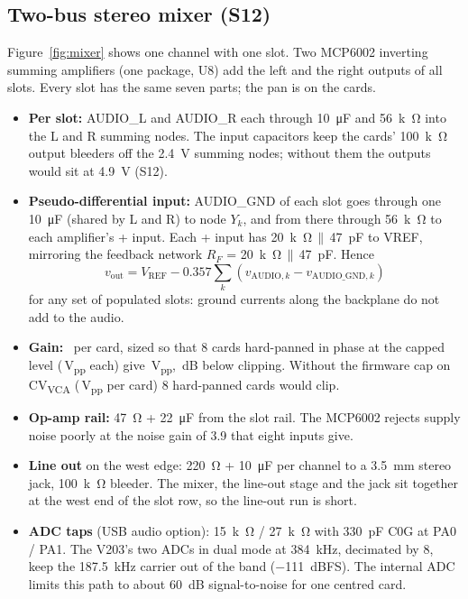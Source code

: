 \documentclass[11pt,a4paper]{article}
\newcommand{\sub}[1]{\textsubscript{#1}}
\begin{document}
\subsection{Two-bus stereo mixer (S12)}\label{sec:mixer}
Figure~\ref{fig:mixer} shows one channel with one slot. Two MCP6002 inverting summing amplifiers (one package, U8) add
the left and the right outputs of all slots. Every slot has the same seven parts; the pan is on the cards.
\begin{itemize}
  \item \textbf{Per slot:} AUDIO\_L and AUDIO\_R each through \SI{10}{\micro F} and \SI{56}{k\ohm} into the L and R
    summing nodes. The input capacitors keep the cards' \SI{100}{k\ohm} output bleeders off the \SI{2.4}{V} summing
    nodes; without them the outputs would sit at \SI{4.9}{V} (S12).
  \item \textbf{Pseudo-differential input:} AUDIO\_GND of each slot goes through one \SI{10}{\micro F} (shared by L and R)
    to node $Y_k$, and from there through \SI{56}{k\ohm} to each amplifier's + input. Each + input has
    \SI{20}{k\ohm}\,$\parallel$\,\SI{47}{pF} to VREF, mirroring the feedback network $R_F$ = \SI{20}{k\ohm}\,$\parallel$\,\SI{47}{pF}. Hence
    \begin{equation}
      v_\mathrm{out} = V_\mathrm{REF} - 0.357 \sum_k \left(v_{\mathrm{AUDIO},k} - v_{\mathrm{AUDIO\_GND},k}\right)
    \end{equation}
    for any set of populated slots: ground currents along the backplane do not add to the audio.
  \item \textbf{Gain:} \statStwelveGain\ per card, sized so that 8 cards hard-panned in phase at the capped level
    (\statStwelveCardHard\,V\sub{pp} each) give \statStwelveHard\,V\sub{pp}, \statStwelveHardMargin\,dB below clipping.
    Without the firmware cap on CV\sub{VCA} (\statStwelveCardUncapped\,V\sub{pp} per card) 8 hard-panned cards would
    clip.
  \item \textbf{Op-amp rail:} \SI{47}{\ohm} + \SI{22}{\micro F} from the slot rail. The MCP6002 rejects supply noise
    poorly at the noise gain of 3.9 that eight inputs give.
  \item \textbf{Line out} on the west edge: \SI{220}{\ohm} + \SI{10}{\micro F} per channel to a \SI{3.5}{mm} stereo jack,
    \SI{100}{k\ohm} bleeder. The mixer, the line-out stage and the jack sit together at the west end of the slot row,
    so the line-out run is short.
  \item \textbf{ADC taps} (USB audio option): \SI{15}{k\ohm} / \SI{27}{k\ohm} with \SI{330}{pF} C0G at PA0 / PA1. The
    V203's two ADCs in dual mode at \SI{384}{kHz}, decimated by 8, keep the \SI{187.5}{kHz} carrier out of the band
    (\SI{-111}{dBFS}). The internal ADC limits this path to about \SI{60}{dB} signal-to-noise for one centred card.
\end{itemize}
\end{document}
